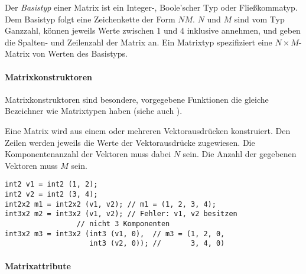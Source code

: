 Der \emph{Basistyp} einer Matrix ist ein Integer-, Boole'scher Typ oder Fließkommatyp.
Dem Basistyp folgt eine Zeichenkette der Form $N$$M$. $N$ und
$M$ sind vom Typ Ganzzahl, können jeweils Werte zwischen 1 und 4 inklusive annehmen,
und geben die Spalten- und Zeilenzahl
der Matrix an. Ein Matrixtyp spezifiziert eine  $N \times M$-Matrix von Werten des Basistyps.

\paragraph{Matrixkonstruktoren}\label{Matrixkonstruktoren}

Matrixkonstruktoren sind besondere, vorgegebene Funktionen die gleiche Bezeichner wie Matrixtypen haben
(siehe auch ).


Eine Matrix wird aus einem oder mehreren Vektorausdrücken konstruiert. Den Zeilen werden
jeweils die Werte der Vektorausdrücke zugewiesen. Die Komponentenanzahl der Vektoren muss dabei
$N$ sein. Die Anzahl der gegebenen Vektoren muss $M$ sein.


\begin{lstlisting}
int2 v1 = int2 (1, 2);
int2 v2 = int2 (3, 4);
int2x2 m1 = int2x2 (v1, v2); // m1 = (1, 2, 3, 4);
int3x2 m2 = int3x2 (v1, v2); // Fehler: v1, v2 besitzen
			     // nicht 3 Komponenten
int3x2 m3 = int3x2 (int3 (v1, 0),  // m3 = (1, 2, 0,
                    int3 (v2, 0)); //       3, 4, 0)
\end{lstlisting}



\paragraph{Matrixattribute}\label{Matrixattribute}

